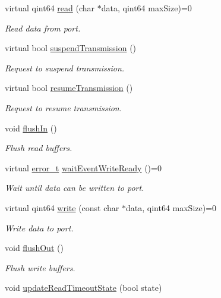 \begin{DoxyCompactItemize}
virtual qint64 \hyperlink{classmdt_abstract_port_a9d9c45220d5328c9856a2445557fe970}{read} (char $\ast$data, qint64 maxSize)=0
\begin{DoxyCompactList}\small\item\em Read data from port. \end{DoxyCompactList}\item 
virtual bool \hyperlink{classmdt_abstract_port_aff3d79248baf96e670eba6d2fef700b9}{suspendTransmission} ()
\begin{DoxyCompactList}\small\item\em Request to suspend transmission. \end{DoxyCompactList}\item 
virtual bool \hyperlink{classmdt_abstract_port_ad4a04c995df881593db0a309000be7a7}{resumeTransmission} ()
\begin{DoxyCompactList}\small\item\em Request to resume transmission. \end{DoxyCompactList}\item 
void \hyperlink{classmdt_abstract_port_a32329b4188db796401e4f454755acb44}{flushIn} ()
\begin{DoxyCompactList}\small\item\em Flush read buffers. \end{DoxyCompactList}\item 
virtual \hyperlink{classmdt_abstract_port_ad4121bb930c95887e77f8bafa065a85e}{error\_\-t} \hyperlink{classmdt_abstract_port_a35e4686f50e2c53c7e3618cf2c485d92}{waitEventWriteReady} ()=0
\begin{DoxyCompactList}\small\item\em Wait until data can be written to port. \end{DoxyCompactList}\item 
virtual qint64 \hyperlink{classmdt_abstract_port_a64d4802975a76474b9196c91f57a6d90}{write} (const char $\ast$data, qint64 maxSize)=0
\begin{DoxyCompactList}\small\item\em Write data to port. \end{DoxyCompactList}\item 
void \hyperlink{classmdt_abstract_port_ad199c6310801893f1f7de2a2391606fc}{flushOut} ()
\begin{DoxyCompactList}\small\item\em Flush write buffers. \end{DoxyCompactList}\item 
void \hyperlink{classmdt_abstract_port_a0fc7317e988d5dea53a999cd1bf4faa9}{updateReadTimeoutState} (bool state)

\end{DoxyCompactItemize}
